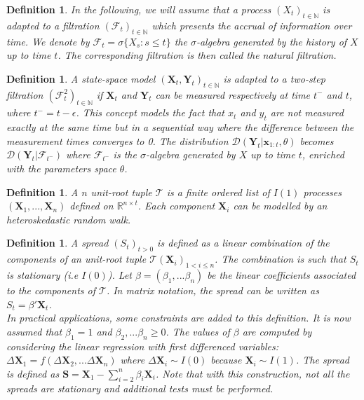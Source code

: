 \documentclass[11pt,a4,twosided,singlespacing,titlepagenumber=on]{scrreprt}
\numberwithin{equation}{chapter} %
\newtheorem{definition}[theorem]{Definition}%
\theoremstyle{remark}
\newcommand{\matr}[1]{\mathbf{#1}}
\begin{document}
\begin{definition}
In the following, we will assume that a process $(X_t)_{t \in \mathbb{N}}$ is adapted to a filtration $(\mathcal{F}_t)_{t \in \mathbb{N}}$ which presents the accrual of information over time. We denote by $\mathcal{F}_t = \sigma \{X_s : s \leq t \}$ the $\sigma$-algebra generated by the history of $X$ up to time $t$. The corresponding filtration is then called the natural filtration.
\end{definition}

\begin{definition}
A state-space model $(\matr{X}_t, \matr{Y}_t)_{t \in \mathbb{N}}$ is adapted to a two-step filtration $(\mathcal{F}^2_t)_{t \in \mathbb{N}}$ if $\matr{X}_t$ and $\matr{Y}_t$ can be measured respectively at time $t^-$ and $t$, where $t^- = t - \epsilon$. This concept models the fact that $x_t$ and $y_t$ are not measured exactly at the same time but in a sequential way where the difference between the measurement times converges to 0. The distribution $\mathcal{D}(\matr{Y}_t | \matr{x}_{1:t}, \theta)$ becomes $\mathcal{D}(\matr{Y}_t | \mathcal{F}_{t^-})$ where $\mathcal{F}_{t^-}$ is the $\sigma$-algebra generated by $X$ up to time $t$, enriched with the parameters space $\theta$.
\end{definition}

\begin{definition}
A $n$ unit-root tuple $\mathcal{T}$ is a finite ordered list of $I(1)$ processes $(\matr{X}_1, ..., \matr{X}_n)$ defined on $\mathbb{R}^{n \times t}$. Each component $\matr{X}_i$ can be modelled by an heteroskedastic random walk. \label{definition_tuple}
\end{definition}

\begin{definition}
\label{spread_def}
A spread $(S_t)_{t>0}$ is defined as a linear combination of the components of an unit-root tuple $\mathcal{T} (\matr{X}_i)_{1 < i \leq n}$. The combination is such that $S_t$ is stationary (i.e $I(0)$). Let $\beta = (\beta_1,...\beta_n)$ be the linear coefficients associated to the components of $\mathcal{T}$. In matrix notation, the spread can be written as $S_t = \beta' \matr{X}_t$. \\
In practical applications, some constraints are added to this definition. It is now assumed that $\beta_1 = 1$ and $\beta_2,...\beta_n \geq 0$. The values of $\beta$ are computed by considering the linear regression with first differenced variables: $\Delta \matr{X}_1 = f(\Delta \matr{X}_2,...\Delta \matr{X}_n)$ where $\Delta \matr{X}_i \sim I(0)$ because $\matr{X}_i \sim I(1)$. The spread is defined as $\matr{S} = \matr{X}_1 - \sum_{i=2}^n \beta_i \matr{X}_i$. Note that with this construction, not all the spreads are stationary and additional tests must be performed.
\end{definition}
\end{document}
